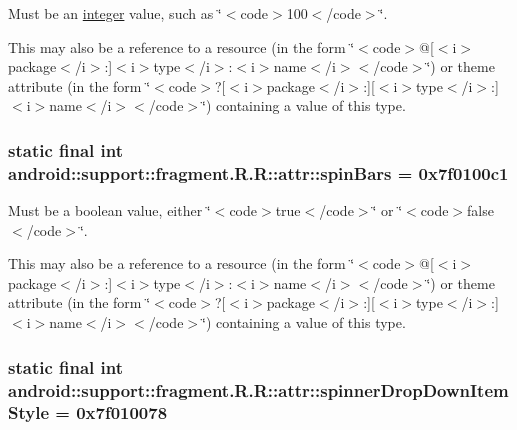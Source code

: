 Must be an \hyperlink{classandroid_1_1support_1_1fragment_1_1_r_1_1integer}{integer} value, such as \char`\"{}$<$code$>$100$<$/code$>$\char`\"{}. 

This may also be a reference to a resource (in the form \char`\"{}$<$code$>$@\mbox{[}$<$i$>$package$<$/i$>$:\mbox{]}$<$i$>$type$<$/i$>$:$<$i$>$name$<$/i$>$$<$/code$>$\char`\"{}) or theme attribute (in the form \char`\"{}$<$code$>$?\mbox{[}$<$i$>$package$<$/i$>$:\mbox{]}\mbox{[}$<$i$>$type$<$/i$>$:\mbox{]}$<$i$>$name$<$/i$>$$<$/code$>$\char`\"{}) containing a value of this type. \hypertarget{classandroid_1_1support_1_1fragment_1_1_r_1_1attr_86f2633d6aeff66ef6231addcc0b902f}{
\subsubsection[{spinBars}]{\setlength{\rightskip}{0pt plus 5cm}static final int android::support::fragment.R.R::attr::spinBars = 0x7f0100c1}}
\label{classandroid_1_1support_1_1fragment_1_1_r_1_1attr_86f2633d6aeff66ef6231addcc0b902f}


Must be a boolean value, either \char`\"{}$<$code$>$true$<$/code$>$\char`\"{} or \char`\"{}$<$code$>$false$<$/code$>$\char`\"{}. 

This may also be a reference to a resource (in the form \char`\"{}$<$code$>$@\mbox{[}$<$i$>$package$<$/i$>$:\mbox{]}$<$i$>$type$<$/i$>$:$<$i$>$name$<$/i$>$$<$/code$>$\char`\"{}) or theme attribute (in the form \char`\"{}$<$code$>$?\mbox{[}$<$i$>$package$<$/i$>$:\mbox{]}\mbox{[}$<$i$>$type$<$/i$>$:\mbox{]}$<$i$>$name$<$/i$>$$<$/code$>$\char`\"{}) containing a value of this type. \hypertarget{classandroid_1_1support_1_1fragment_1_1_r_1_1attr_10f1d4d0a72a99bc5dd506cfbf8297ae}{
\subsubsection[{spinnerDropDownItemStyle}]{\setlength{\rightskip}{0pt plus 5cm}static final int android::support::fragment.R.R::attr::spinnerDropDownItemStyle = 0x7f010078}}
\label{classandroid_1_1support_1_1fragment_1_1_r_1_1attr_10f1d4d0a72a99bc5dd506cfbf8297ae}


